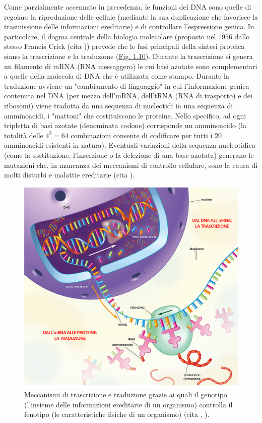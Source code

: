 \documentclass[12pt,a4paper,twoside]{report}
\begin{document}
	Come parzialmente accennato in precedenza, le funzioni del DNA sono quelle di regolare la riproduzione delle cellule (mediante la sua duplicazione che favorisce la trasmissione delle informazioni ereditarie) e di controllare l'espressione genica. In particolare, il dogma centrale della biologia molecolare (proposto nel $1956$ dallo stesso Francis Crick (cita
	)) prevede che le fasi principali della sintesi proteica siano la trascrizione e la traduzione (\hyperref[fig:dna_rna]{Fig. 1.10}). Durante la trascrizione si genera un filamento di mRNA (RNA messaggero) le cui basi azotate sono complementari a quelle della molecola di DNA che è utilizzata come stampo. Durante la traduzione avviene un "cambiamento di linguaggio" in cui l'informazione genica contenuta nel DNA (per mezzo dell'mRNA, dell'tRNA (RNA di trasporto) e dei ribosomi) viene tradotta da una sequenza di nucleotidi in una sequenza di amminoacidi, i "mattoni" che costituiscono le proteine. Nello specifico, ad ogni tripletta di basi azotate (denominata codone) corrisponde un amminoacido (la totalità delle $4^3=64$ combinazioni consente di codificare per tutti i 20 amminoacidi esistenti in natura). Eventuali variazioni della sequenza nucleotidica (come la sostituzione, l'inserzione o la delezione di una base azotata) generano le mutazioni che, in mancanza dei meccanismi di controllo cellulare, sono la causa di molti disturbi e malattie ereditarie (cita
	).
	
	\begin{figure}[H]
		\centering
		\includegraphics[width=0.9\linewidth]{dna_rna.jpg}
		\caption{Meccanismi di trascrizione e traduzione grazie ai quali il genotipo (l'insieme delle informazioni ereditarie di un organismo) controlla il fenotipo (le caratteristiche fisiche di un organismo) (cita
			,
			).}
		\label{fig:dna_rna}
	\end{figure}
	
\end{document}
